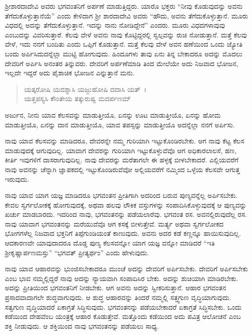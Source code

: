 ಶ‍್ರೀಶಾರದಾದೇವಿ ಅವರು ಭಗವಂತನಿಗೆ ಅರ್ಪಣೆ ಮಾಡುತ್ತಿದ್ದರು. ಯಾರೊ ಭಕ್ತರು “ನೀವು ಕೊಡುವುದನ್ನು ಅವನು ತೆಗೆದುಕೊಳ್ಳುತ್ತಾನೆಯೆ” ಎಂದು ಕೇಳಿದಾಗ ಶ‍್ರೀ ಶಾರದಾದೇವಿ ಅವರು “ಹೌದು, ಅವನು ತೆಗೆದುಕೊಳ್ಳುತ್ತಾನೆ. ಮೂರು ವಿಧದಲ್ಲಿ ಅದನ್ನು ತೆಗೆದುಕೊಳ್ಳುತ್ತಾನೆ. ಇದನ್ನು ನಾನು ನೋಡಿದ್ದೇನೆ” ಎಂದರು. ಮೂರು ವಿಧದಗಳಾವುವು ಎಂಬುದನ್ನು ವಿವರಿಸುತ್ತಾರೆ. ಕೆಲವು ವೇಳೆ ಅವನು ನಾವು ಕೊಟ್ಟಿದ್ದರಲ್ಲಿ ಸ್ವಲ್ಪವನ್ನು ರುಚಿ ನೋಡುತ್ತಾನೆ. ಮತ್ತೆ ಕೆಲವು ವೇಳೆ, ಇದು ನನಗೆ ಬಂದಿತು ಎಂದು ಒಪ್ಪಿಗೆ ಕೊಡುತ್ತಾನೆ. ಮತ್ತೆ ಕೆಲವು ವೇಳೆ ಅವನ ಹಣೆಯಿಂದ ಒಂದು ಜ್ಯೋತಿ ಬಂದು ಅರ್ಪಿಸಿದುದನ್ನೆಲ್ಲಾ ಮುಟ್ಟಿ ಹೋಗುವುದು. ಹಿಂದೂಗಳು ತಾವು ಏನು ತಿನ್ನ ಬೇಕಾದರೂ ಅದನ್ನು ಮೊದಲು ದೇವರಿಗೆ ಅರ್ಪಿಸಿ ಅನಂತರ ತಿನ್ನುವರು. ದೇವರಿಗೆ ಅರ್ಪಣೆಮಾಡಿ ತಿಂದ ಮೇಲೆಯೇ ಅದು ನಿಜವಾದ ಭೋಜನ, ಇಲ್ಲದೇ ಇದ್ದರೆ ಅದು ಪೈಶಾಚಿಕ ಭೋಜನ ಎನ್ನುತ್ತಾನೆ ಮನು.

\begin{verse}
ಯತ್ಕರೋಷಿ ಯದಶ್ನಾಸಿ ಯಜ್ಜುಹೋಷಿ ದದಾಸಿ ಯತ್~।\\ಯತ್ತಪಸ್ಯಸಿ ಕೌಂತೇಯ ತತ್ಕುರುಷ್ವ ಮದರ್ಪಣಮ್ 
\end{verse}

{\small ಅರ್ಜುನ, ನೀನು ಯಾವ ಕೆಲಸವನ್ನು ಮಾಡುತ್ತೀಯೊ, ಏನನ್ನು ಊಟ ಮಾಡುತ್ತೀಯೊ, ಏನನ್ನು ಹೋಮ ಮಾಡುತ್ತೀಯೊ, ಏನನ್ನು ದಾನ ಮಾಡುತ್ತೀಯೊ, ಯಾವ ತಪಸ್ಸನ್ನು ಮಾಡುತ್ತೀಯೊ ಅದನ್ನೆಲ್ಲಾ ನನಗೆ ಅರ್ಪಿಸು.}

ನಾವು ಯಾವ ಕೆಲಸವನ್ನು ಮಾಡಿದರೂ, ದೇವರನ್ನೇ ನಮ್ಮ ಗುರಿಯಾಗಿ ಇಟ್ಟುಕೊಂಡಿರಬೇಕು. ಆಗ ನಾವು ಕೆಟ್ಟ ಕೆಲಸ ಮಾಡುವುದಕ್ಕೆ ಆಗುವುದಿಲ್ಲ. ಯಾವಾಗ ದೇವರನ್ನು ಗುರಿಯಾಗಿ ಇಟ್ಟುಕೊಳ್ಳುವೆವೊ ಆಗ ಅಧಿಕಾರಲಾಲಸೆ, ಹಣ, ಕೀರ್ತಿ ಇವುಗಳಿಗೆ ದಾಸರಾಗುವುದಿಲ್ಲ. ನಾವು ದೇವರನ್ನು ಮರೆತಾಗಲೇ ಈ ಹಳ್ಳಕ್ಕೆ ಬೀಳಬೇಕಾದರೆ. ಎಲ್ಲಿಯವರೆಗೆ ನಾವು ಅವನನ್ನು ಚೆನ್ನಾಗಿ ಜ್ಞಾಪಕದಲ್ಲಿ ಇಟ್ಟುಕೊಂಡಿರುವೆವೋ ಅಲ್ಲಿಯವರೆಗೆ ನಮ್ಮಿಂದ ಒಳ್ಳೆಯ ಕೆಲಸವೇ ಆಗುತ್ತ ಇರುವುದು.

ನಾವು ಯಾವ ಯಾಗ ಯಜ್ಞ ಮಾಡಿದರೂ ಭಗವಂತನ ಪ್ರೀತಿಗಾಗಿ ಅದರಿಂದ ಬರುವ ಪುಣ್ಯವನ್ನೆಲ್ಲ ಅರ್ಪಿಸಬೇಕು. ಕೇವಲ ಸ್ವರ್ಗಲೋಕಕ್ಕೆ ಹೋಗುವುದಕ್ಕೆ, ಅಥವಾ ಹಲವು ಲೌಕಿಕ ವಸ್ತುಗಳನ್ನು ಸಂಪಾದಿಸಿಕೊಳ್ಳುವುದಕ್ಕೆ ಆ ಪುಣ್ಯವನ್ನು ಖರ್ಚು ಮಾಡಬಾರದು. ಇದರಿಂದ ನಾವು, ಭಗವಂತನನ್ನು ಪಡೆಯಲಾರೆವು. ಭಗವಂತ ರಸ. ಅವನಲ್ಲಿರುವುದೆಲ್ಲ ರಸ. ನಾವು ಯಾವಾಗ ಭಗವಂತನನ್ನು ಮರೆಯುವೆವೊ ಆಗ ಕಸಕ್ಕೆ ಬೀಳುತ್ತೇವೆ. ಮರ್ತ್ಯ ಅಥವಾ ಸ್ವರ್ಗಲೋಕದ ಭೋಗಗಳೆಲ್ಲ ನಿಜವಾದ ಭಕ್ತನಿಗೆ ತಿಪ್ಪೆಗುಂಡಿಯಂತೆ ಕಾಣುವುದು. ಅವನು ಅದರ ಕಡೆ ಕಣ್ಣನ್ನೂ ಹಾಯಿಸುವುದಿಲ್ಲ. ಆದಕಾರಣವೇ ಯಾವುದಾದರೂ ದೊಡ್ಡ ಪುಣ್ಯ ಕೆಲಸವನ್ನೋ ಯಾಗ ಯಜ್ಞ ವನ್ನೋ ಮಾಡಿದರೆ “ಇತಿ ಶ‍್ರೀಕೃಷ್ಣಾರ್ಪಣಮಸ್ತು” “ಭಗವತ್ ಪ್ರೀತ್ಯರ್ಥಂ” ಎಂದು ಹೇಳುವುದು.

ನಾವು ಯಾವ ಆಹಾರವನ್ನು ಭುಂಜಿಸಬೇಕಾದರೂ ಮುಂಚೆ ಅದನ್ನು ದೇವರಿಗೆ ಅರ್ಪಿಸಬೇಕು. ದೇವರಿಗೆ ಅರ್ಪಿಸಬೇಕು ಎಂಬ ಭಾವ ನಮ್ಮಲ್ಲಿದ್ದರೆ ನಾವು ಅದನ್ನು ನ್ಯಾಯವಾಗಿ ಸಂಪಾದಿಸಿರ ಬೇಕು. ಅದನ್ನು ಶುಚಿಯಾಗಿ ಮಾಡಿರಬೇಕು. ಅದನ್ನು ಪ್ರೀತಿಯಿಂದ ಭಗವಂತನಿಗೆ ನೀಡಬೇಕು. ಆಗ ಅವನು ಅದನ್ನು ಸ್ವೀಕರಿಸುತ್ತಾನೆ. ಆಹಾರ ಭಗವಂತನ ಪ್ರಸಾದವಾದಾಗಲೇ ಶುದ್ಧವಾಗುವುದು. ಆ ಶುದ್ಧ ಆಹಾರವನ್ನು ತಿಂದರೆ ನಮ್ಮಲ್ಲಿ ಸತ್ತ್ವಗುಣ ವೃದ್ಧಿಯಾಗುವುದು. ಸತ್ವಗುಣ ವೃದ್ಧಿಯಾದರೆ ಏಕಾಗ್ರತೆ ಸಿದ್ಧಿಸುವುದು. ಭಗವಂತನನ್ನು ಪಡೆಯಬೇಕಾದರೆ ಏಕಾಗ್ರತೆ ಸಿದ್ಧಿಸಬೇಕು. ಒಂದು ಕಡೆಯಿಂದ ದೇಹವೆಂಬ ಯಂತ್ರಕ್ಕೆ ಆಹಾರ ಕೊಡುತ್ತೇವೆ. ಮತ್ತೊಂದು ಕಡೆಯಿಂದ ಅದು ಪವಿತ್ರ ಆಲೋಚನೆ ಎಂಬ ಶಕ್ತಿ ನೀಡುವುದು. ಆ ಶಕ್ತಿಯಿಂದ ನಾವು ಭಗವಂತನನ್ನು ಪಡೆಯಲು ಸಾಧ್ಯ.

